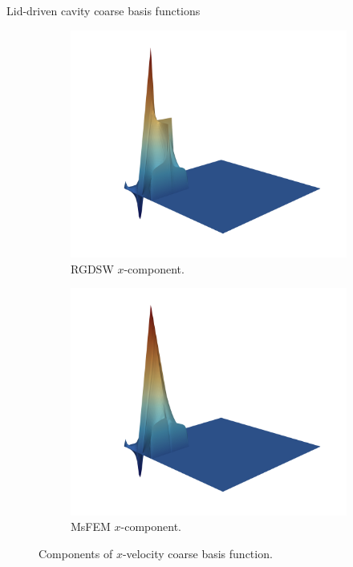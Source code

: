 \begin{frame}{Lid-driven cavity coarse basis functions}
	\begin{figure}
		\centering
		\begin{subfigure}{0.5\textwidth}
			\includegraphics[width=\textwidth]{images/RGDSW-x}
			\caption{RGDSW $x$-component.}
		\end{subfigure}%
		\begin{subfigure}{0.5\textwidth}
			\includegraphics[width=\textwidth]{images/MsFEM-x}
			\caption{MsFEM $x$-component.}
		\end{subfigure}
		\caption{Components of $x$-velocity coarse basis function.}
	\end{figure}
\end{frame}

